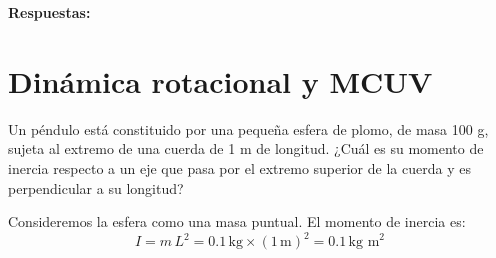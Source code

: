 \documentclass[addpoints]{exam}
\newcommand{\rtas}{\textbf{Respuestas: }}
\begin{document}
\begin{questions}
    \rtas

    \section{Dinámica rotacional y MCUV}

    \question Un péndulo está constituido por una pequeña esfera de plomo, de masa 100 g, sujeta al extremo de una cuerda de 1 m de longitud. ¿Cuál es su momento de inercia respecto a un eje que pasa por el extremo superior de la cuerda y es perpendicular a su longitud?

    \begin{solution}
        Consideremos la esfera como una masa puntual. El momento de inercia es: $$I = m \, L^2 = 0.1 \, \text{kg} \times \left(1 \, \text{m}\right)^2 = 0.1 \, \text{kg m}^2$$
    \end{solution}




\end{questions}
\end{document}
